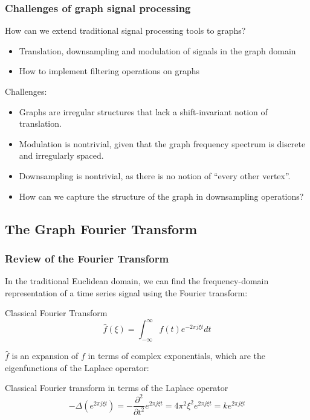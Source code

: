 \documentclass{beamer}
\begin{document}
\begin{frame}
  \frametitle{Challenges of graph signal processing}
  How can we extend traditional signal processing tools to graphs?
  \begin{itemize}
    \item Translation, downsampling and modulation of signals in the graph
      domain
    \item How to implement filtering operations on graphs
  \end{itemize}

  Challenges:
  \begin{itemize}
  \item Graphs are irregular structures that lack a shift-invariant notion of translation.
  \item Modulation is nontrivial, given that the graph frequency spectrum is
    discrete and irregularly spaced.
  \item Downsampling is nontrivial, as there is no notion of ``every other
    vertex''.
  \item How can we capture the structure of the graph in downsampling operations?
  \end{itemize}
\end{frame}


\subsection{The Graph Fourier Transform}

\begin{frame}
\frametitle{Review of the Fourier Transform}

In the traditional Euclidean domain, we can find the frequency-domain
representation of a time series signal using the Fourier transform:

\begin{block}{Classical Fourier Transform}
  \begin{equation}
    \hat{f}(\xi) = \int_{-\infty}^{\infty} f(t) e^{-2 \pi j \xi t} dt 
  \end{equation}
\end{block}

$\hat{f}$ is an expansion of $f$ in terms of complex exponentials, which are the
eigenfunctions of the Laplace operator:

\begin{block}{Classical Fourier transform in terms of the Laplace operator}
  \begin{equation}
    - \Delta (e^{2 \pi j \xi t}) = - \frac{\partial^2}{\partial t^2} e^{2 \pi j \xi t} = 4 \pi^2 \xi^2 e^{2 \pi j \xi t} = k e^{2 \pi j \xi t}
  \end{equation}
\end{block}
\end{frame}
\end{document}
